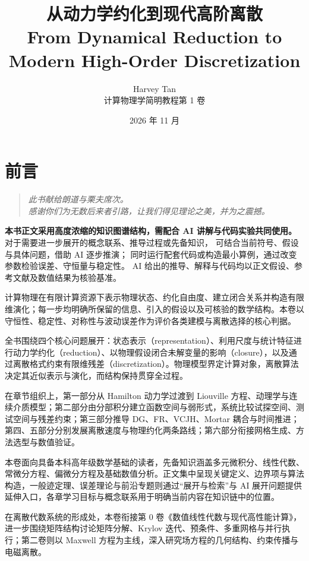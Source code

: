 \documentclass[11pt,openany]{ctexbook}
\title{从动力学约化到现代高阶离散\\[0.6em]\large From Dynamical Reduction to Modern High-Order Discretization}
\author{Harvey Tan\\[0.6em]\large 计算物理学简明教程\quad 第 1 卷}
\date{2026 年 11 月}
\begin{document}
\frontmatter
\maketitle
\chapter*{前言}
\begin{quote}
\itshape
此书献给朗道与栗夫席次。\\
感谢你们为无数后来者引路，让我们得见理论之美，并为之震撼。
\end{quote}
\begin{tcolorbox}[colback=red!3,colframe=red!65!black,title={使用说明：AI 讲解与代码实验},fonttitle=\bfseries,boxrule=0.8pt,arc=1mm,breakable]
\textbf{本书正文采用高度浓缩的知识图谱结构，需配合 AI 讲解与代码实验共同使用。}
对于需要进一步展开的概念联系、推导过程或先备知识，
可结合当前符号、假设与具体问题，借助 AI 逐步推演；
同时运行配套代码或构造最小算例，通过改变参数检验误差、守恒量与稳定性。
AI 给出的推导、解释与代码均以正文假设、参考文献及数值结果为核验基准。
\end{tcolorbox}
计算物理在有限计算资源下表示物理状态、约化自由度、建立闭合关系并构造有限维演化；每一步均明确所保留的信息、引入的假设以及可核验的数学结构。本卷以守恒性、稳定性、对称性与波动误差作为评价各类建模与离散选择的核心判据。

全书围绕四个核心问题展开：状态表示（representation）、利用尺度与统计特征进行动力学约化（reduction）、以物理假设闭合未解变量的影响（closure），以及通过离散格式约束有限维残差（discretization）。物理模型界定计算对象，离散算法决定其近似表示与演化，而结构保持贯穿全过程。

在章节组织上，第一部分从 Hamilton 动力学过渡到 Liouville 方程、动理学与连续介质模型；第二部分由分部积分建立函数空间与弱形式，系统比较试探空间、测试空间与残差约束；第三部分推导 DG、FR、VCJH、Mortar 耦合与时间推进；第四、五部分分别发展离散速度与物理约化两条路线；第六部分衔接网格生成、方法选型与数值验证。

本卷面向具备本科高年级数学基础的读者，先备知识涵盖多元微积分、线性代数、常微分方程、偏微分方程及基础数值分析。正文集中呈现关键定义、边界项与算法构造，一般迹定理、误差理论与前沿专题则通过“展开与检索”与 AI 展开问题提供延伸入口，各章学习目标与概念联系用于明确当前内容在知识链中的位置。

在离散代数系统的形成处，本卷衔接第 0 卷《数值线性代数与现代高性能计算》，进一步围绕矩阵结构讨论矩阵分解、Krylov 迭代、预条件、多重网格与并行执行；第二卷则以 Maxwell 方程为主线，深入研究场方程的几何结构、约束传播与电磁离散。
\end{document}
